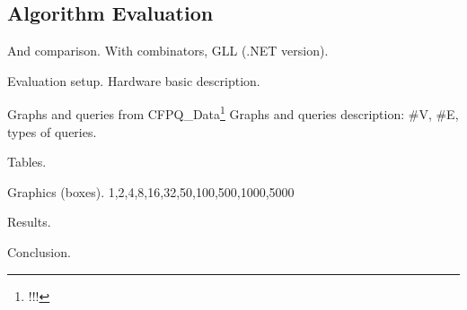 \subsection{Algorithm Evaluation}

And comparison. With combinators, GLL (.NET version).

Evaluation setup.
Hardware basic description.

Graphs and queries from CFPQ\_Data\footnote{!!!}
Graphs and queries description: \#V, \#E, types of queries.

Tables.

Graphics (boxes). 1,2,4,8,16,32,50,100,500,1000,5000

Results.

Conclusion. 